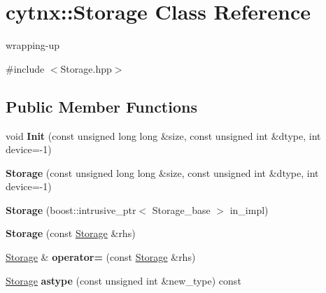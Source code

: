 \hypertarget{classcytnx_1_1Storage}{}\section{cytnx\+:\+:Storage Class Reference}
\label{classcytnx_1_1Storage}


wrapping-\/up  




{\ttfamily \#include $<$Storage.\+hpp$>$}

\subsection*{Public Member Functions}
\begin{DoxyCompactItemize}
\item 
\mbox{\label{classcytnx_1_1Storage_a6bf182da2184ef93e9c255540203cc54}} 
void {\bfseries Init} (const unsigned long long \&size, const unsigned int \&dtype, int device=-\/1)
\item 
\mbox{\label{classcytnx_1_1Storage_a91232518b73848515e0fdf342d4407fd}} 
{\bfseries Storage} (const unsigned long long \&size, const unsigned int \&dtype, int device=-\/1)
\item 
\mbox{\label{classcytnx_1_1Storage_ab602ecd72e5fc4224922a6b6212ff120}} 
{\bfseries Storage} (boost\+::intrusive\+\_\+ptr$<$ Storage\+\_\+base $>$ in\+\_\+impl)
\item 
\mbox{\label{classcytnx_1_1Storage_a095c6d65c93d237ad4d94cf241b1555e}} 
{\bfseries Storage} (const \hyperlink{classcytnx_1_1Storage}{Storage} \&rhs)
\item 
\mbox{\label{classcytnx_1_1Storage_a1ee2ea67e2197bc9d690ca8a1b878f73}} 
\hyperlink{classcytnx_1_1Storage}{Storage} \& {\bfseries operator=} (const \hyperlink{classcytnx_1_1Storage}{Storage} \&rhs)
\item 
\mbox{\label{classcytnx_1_1Storage_a8310d8dbb70510272ded2e3d01be25f0}} 
\hyperlink{classcytnx_1_1Storage}{Storage} {\bfseries astype} (const unsigned int \&new\+\_\+type) const
\item 
\mbox{\label{classcytnx_1_1Storage_a643824801e81ab86aca055f1dd1f34d7}} 

\end{DoxyCompactItemize}
